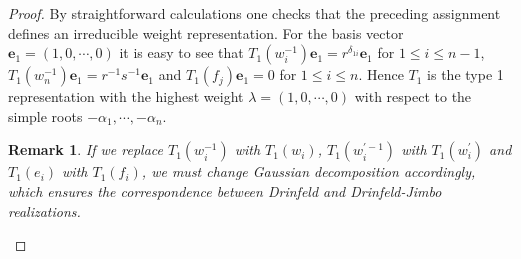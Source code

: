 \documentclass[10pt,a4paper]{amsart}
\newtheorem{remark}[theorem]{Remark}
\numberwithin{equation}{section}
\begin{document}
\begin{proof}
	By straightforward calculations one checks that the preceding assignment
	defines an irreducible weight representation. For the basis vector $\mathbf{e}_1=(1,0, \cdots, 0)$ it is easy to see that $T_1\left(w_i^{-1}\right) \mathbf{e}_1=r^{\delta_{1 i}} \mathbf{e}_1$ for $1 \leq i \leq n-1$, $T_1\left(w_n^{-1}\right) \mathbf{e}_1=r^{-1} s^{-1} \mathbf{e}_1$ and $T_1\left(f_j\right) \mathbf{e}_1=0$ for $1 \leq i \leq n$. Hence $T_1$ is the type 1 representation with the highest weight $\lambda=(1,0, \cdots, 0)$ with respect to the simple roots $-\alpha_1, \cdots,-\alpha_n$.
	\begin{remark}
		If we replace $T_1\left(w_i^{-1}\right)$ with $T_1\left(w_i\right)$,  $T_1\left(w_i^{\prime-1}\right)$ with $T_1\left(w_i^{\prime}\right)$ and $T_1\left(e_i\right)$ with $T_1\left(f_i\right)$, we must change Gaussian decomposition accordingly, which ensures the correspondence between Drinfeld and Drinfeld-Jimbo realizations.
	\end{remark}
\end{proof}
\end{document}
